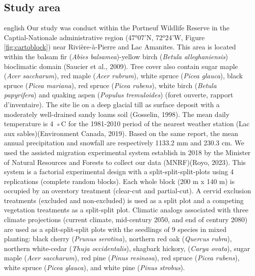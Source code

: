 \subsection*{Study area}
\label{subsec:area}

\begin{otherlanguage*}{english}
  Our study was conduct within the Portneuf Wildlife Reserve in the Captial-Nationale administrative region (47°07'N, 72°24'W, Figure \ref{fig:cartoblock}) near Rivière-à-Pierre and Lac Amanites. 
  This area is located within the balsam fir (\textit{Abies balsamea})-yellow birch (\textit{Betula alleghaniensis}) bioclimatic domain (Saucier et al., 2009).
  Tree cover also contain sugar maple (\textit{Acer saccharum}), red maple (\textit{Acer rubrum}), white spruce (\textit{Picea glauca}), black spruce (\textit{Picea mariana}), red spruce (\textit{Picea rubens}),
  white birch (\textit{Betula papyrifera}) and quaking aspen (\textit{Populus tremuloides}) (foret ouverte, rapport d'inventaire). 
  The site lie on a deep glacial till as surface deposit with a moderately well-drained sandy loams soil (Gosselin, 1998).
  The mean daily temperature is 4 ◦C for the 1981-2010 period of the nearest weather station (Lac aux sables)(Environment Canada, 2019). 
  Based on the same report, the mean annual precipitation and snowfall are respectively 1133.2 mm and 230.3 cm.
  We used the assisted migration experimental system establish in 2018 by the Minister of Natural Resources and Forests to collect our data (MNRF)(Royo, 2023).
  This system is a factorial experimental design with a split-split-split-plots using 4 replications (complete random blocks). 
  Each whole block (200 m x 140 m) is occupied by an overstory treatment (clear-cut and partial-cut). 
  A cervid exclusion treatments (excluded and non-excluded) is used as a split plot and a competing vegetation treatments as a split-split plot. 
  Climatic analogs associated with three climate projections (current climate, mid-century 2050, and end of century 2080) 
  are used as a split-split-split plots with the seedlings of 9 species in mixed planting: black cherry (\textit{Prunus serotina}), northern red oak (\textit{Quercus rubra}), 
  northern white-cedar (\textit{Thuja occidentalis}), shagbark hickory, (\textit{Carya ovata}), sugar maple (\textit{Acer saccharum}), red pine (\textit{Pinus resinosa}), 
  red spruce (\textit{Picea rubens}), white spruce (\textit{Picea glauca}), and white pine (\textit{Pinus strobus}).

\end{otherlanguage*}

